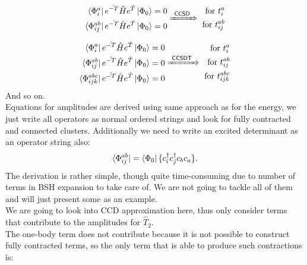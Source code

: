 \documentclass[twoside,english]{uiofysmaster}
\theoremstyle{definition}
\begin{document}
\begin{eqnarray}
\begin{aligned}
\bra{\Phi_{i}^{a}}e^{\hat{-T}} \hat{H} e^{\hat{T}} \ket{\Phi_0}   = 0  \\
\bra{\Phi_{ij}^{ab}}e^{\hat{-T}} \hat{H} e^{\hat{T}} \ket{\Phi_0}   = 0  \end{aligned}
\xRightarrow{~\textsf{CCSD}~}
\begin{aligned}
\text{ for  $t_{i}^{a}$} \\
\text{ for  $t_{ij}^{ab}$} \end{aligned}
\end{eqnarray}

\begin{eqnarray}
\begin{aligned}
\bra{\Phi_{i}^{a}}e^{\hat{-T}} \hat{H} e^{\hat{T}} \ket{\Phi_0}   = 0  \\
\bra{\Phi_{ij}^{ab}}e^{\hat{-T}} \hat{H} e^{\hat{T}} \ket{\Phi_0}   = 0 \\
\bra{\Phi_{ijk}^{abc}}e^{\hat{-T}} \hat{H} e^{\hat{T}} \ket{\Phi_0}   = 0  \\ \end{aligned}
\xRightarrow{~\textsf{CCSDT}~}
\begin{aligned}
\text{ for  $t_{i}^{a}$} \\
\text{ for  $t_{ij}^{ab}$} \\
\text{ for  $t_{ijk}^{abc}$} \end{aligned}
\end{eqnarray}
And so on.\\
Equations for amplitudes are derived using same approach as for the energy, we just write all operators as normal ordered strings and look for fully contracted and connected clusters. Additionally we need to write an excited determinant as an operator string also:
\begin{eqnarray}
\bra{\Phi_{ij}^{ab}} = \bra{\Phi_0} \{  c_i^\dagger c_j^\dagger  c_b  c_a \}.
\end{eqnarray}
The derivation is rather simple, though quite time-consuming due to number of terms in BSH expansion to take care of. We are not going to tackle all of them and will just present some as an example.\\
We are going to look into CCD approximation here, thus only consider terms that contribute to the amplitudes for $\hat{T}_2$.\\
The one-body term does not contribute because it is not possible to construct fully contracted terms, so the only term that is able to produce such contractions is:
\end{document}
